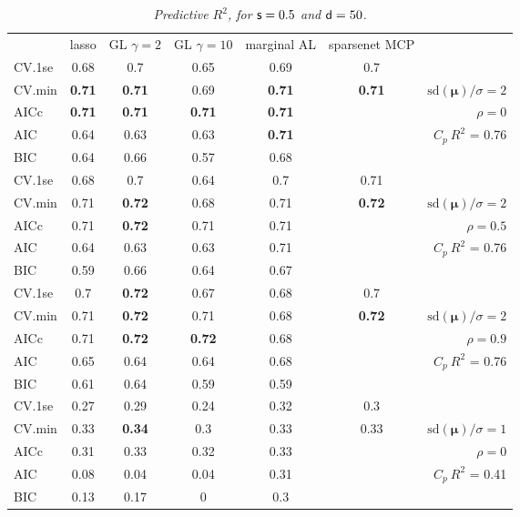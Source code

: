 \documentclass[12pt]{article}
\newcommand{\mr}[1]{\mathrm{#1}}
\newcommand{\bm}[1]{\mathbf{#1}}
\begin{document}
\begin{table}[p]\vspace{-.5cm}
\caption[l]{\label{r2}\it Predictive $R^2$, for ${\sf s}=0.5$ and  ${\sf d}=50$.}
\vspace{-.5cm}
\small{}
\begin{center}
\begin{tabular}{l*{5}{c}|r}
 & lasso & GL $\gamma=2$ & GL $\gamma=10$ & marginal AL & sparsenet MCP  &  \\
\cline{1-7}
CV.1se & 0.68 & 0.7 & 0.65 & 0.69 & 0.7 &\\
CV.min & {\bf 0.71} & {\bf 0.71} & 0.69 & {\bf 0.71} & {\bf 0.71} &  $\mr{sd}(\bm{\mu})/\sigma=2$ \\
AICc & {\bf 0.71} & {\bf 0.71} & {\bf 0.71} & {\bf 0.71} & & $\rho=0$ \\
AIC & 0.64 & 0.63 & 0.63 & {\bf 0.71} & & \multirow{2}{*}{$C_p ~ R^2$ = 0.76} \\
BIC & 0.64 & 0.66 & 0.57 & 0.68 & & \\
 \hline 
CV.1se & 0.68 & 0.7 & 0.64 & 0.7 & 0.71 &\\
CV.min & 0.71 & {\bf 0.72} & 0.68 & 0.71 & {\bf 0.72} &  $\mr{sd}(\bm{\mu})/\sigma=2$ \\
AICc & 0.71 & {\bf 0.72} & 0.71 & 0.71 & & $\rho=0.5$ \\
AIC & 0.64 & 0.63 & 0.63 & 0.71 & & \multirow{2}{*}{$C_p ~ R^2$ = 0.76} \\
BIC & 0.59 & 0.66 & 0.64 & 0.67 & & \\
 \hline 
CV.1se & 0.7 & {\bf 0.72} & 0.67 & 0.68 & 0.7 &\\
CV.min & 0.71 & {\bf 0.72} & 0.71 & 0.68 & {\bf 0.72} &  $\mr{sd}(\bm{\mu})/\sigma=2$ \\
AICc & 0.71 & {\bf 0.72} & {\bf 0.72} & 0.68 & & $\rho=0.9$ \\
AIC & 0.65 & 0.64 & 0.64 & 0.68 & & \multirow{2}{*}{$C_p ~ R^2$ = 0.76} \\
BIC & 0.61 & 0.64 & 0.59 & 0.59 & & \\
 \hline 
CV.1se & 0.27 & 0.29 & 0.24 & 0.32 & 0.3 &\\
CV.min & 0.33 & {\bf 0.34} & 0.3 & 0.33 & 0.33 &  $\mr{sd}(\bm{\mu})/\sigma=1$ \\
AICc & 0.31 & 0.33 & 0.32 & 0.33 & & $\rho=0$ \\
AIC & 0.08 & 0.04 & 0.04 & 0.31 & & \multirow{2}{*}{$C_p ~ R^2$ = 0.41} \\
BIC & 0.13 & 0.17 & 0 & 0.3 & & \\
 \hline 

\end{tabular}
\end{center}
\end{table}
\end{document}
